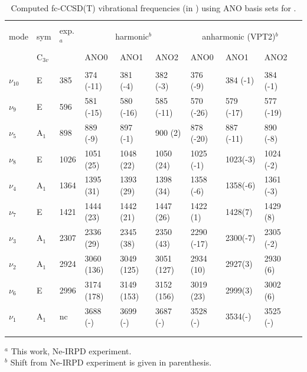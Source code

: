 \begin{landscape}
\begin{center}
\begin{table}[h]
\caption{Computed fc-CCSD(T) vibrational frequencies (in \wn) using ANO basis sets for \pa. }\label{tab:CH3CNH+:tab1}

    \begin{tabular}{llllllllll} \hline\hline\\
            mode        & sym      & exp.$^a$ & \multicolumn{3}{c}{harmonic$^b$}  & \multicolumn{3}{c}{anharmonic (VPT2)$^b$} \\
                        & C$_{3v}$ &      & ANO0        & ANO1       & ANO2       & ANO0        & ANO1      & ANO2 &          \\\hline\\
            $\nu_{10}$  & E	       & 385  & 374 (-11)	& 381  (-4)  & 382  (-3)  & 376  (-9)   & 384 (-1)  & 384  (-1)       \\
            $\nu_9$     & E	       & 596  & 581 (-15)	& 580  (-16) & 585  (-11) & 570  (-26)  & 579 (-17) & 577  (-19)      \\
            $\nu_5$     & A$_1$	   & 898  & 889 (-9)	& 897  (-1)  & 900  (2)   & 878  (-20)  & 887 (-11) & 890  (-8)       \\
            $\nu_8$     & E	       & 1026 & 1051 (25)	& 1048 (22)  & 1050 (24)  & 1025 (-1)   & 1023(-3)  & 1024 (-2)       \\
            $\nu_4$     & A$_1$	   & 1364 & 1395 (31)	& 1393 (29)  & 1398 (34)  & 1358 (-6)   & 1358(-6)  & 1361 (-3)       \\
            $\nu_7$     & E	       & 1421 & 1444 (23)	& 1442 (21)  & 1447 (26)  & 1422 (1)    & 1428(7)   & 1429 (8)        \\
            $\nu_3$     & A$_1$	   & 2307 & 2336 (29)	& 2345 (38)  & 2350 (43)  & 2290 (-17)  & 2300(-7)  & 2305 (-2)       \\
            $\nu_2$     & A$_1$	   & 2924 & 3060 (136)	& 3049 (125) & 3051 (127) & 2934 (10)   & 2927(3)   & 2930 (6)        \\
            $\nu_6$     & E	       & 2996 & 3174 (178)	& 3149 (153) & 3152 (156) & 3019 (23)   & 2999(3)   & 3002 (6)        \\
            $\nu_1$     & A$_1$	   & nc   & 3688 (-)	& 3699 (-)	 & 3687 (-)   & 3528 (-)    & 3534(-)   & 3525 (-)        \\
        \\
        \hline\hline\\
    \end{tabular}
    
    $^a$ This work, Ne-IRPD experiment.\\
    $^b$ Shift from Ne-IRPD experiment is given in parenthesis.
\end{table}
\end{center}
\end{landscape}
\restoregeometry

